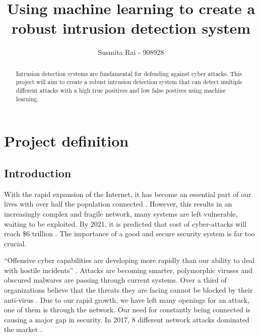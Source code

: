 \documentclass[11pt]{article}
\begin{document}
\title{Using machine learning to create a robust intrusion detection system}
\author{Susmita Rai - 908928}
\date{}
\maketitle
\begin{abstract}
Intrusion detection systems are fundamental for defending against cyber attacks. This project will aim to create a robust intrusion detection system that can detect multiple different attacks with a high true positives and low false postives using machine learning.
\end{abstract}

\newpage

\tableofcontents
\newpage

\setlength{\parskip}{0.5em}

\section{Project definition}
\subsection{Introduction}
With the rapid expansion of the Internet, it has become an essential part of our lives with over half the population connected \cite{wearesocial}. However, this results in an increasingly complex and fragile network, many systems are left vulnerable, waiting to be exploited. By 2021, it is predicted that cost of cyber-attacks will reach \$6 trillion \cite{varonis}. The importance of a good and secure security system is far too crucial.

“Offensive cyber capabilities are developing more rapidly than our ability to deal with hostile incidents” \cite{globalrisks}. Attacks are becoming smarter, polymorphic viruses and obscured malwares are passing through current systems. Over a third of organizations believe that the threats they are facing cannot be blocked by their anti-virus \cite{varonis}. 
Due to our rapid growth, we have left many openings for an attack, one of them is through the network. Our need for constantly being connected is causing a major gap in security. In 2017, 8 different network attacks dominated the market \cite{network-attack-types}.
\end{document}

